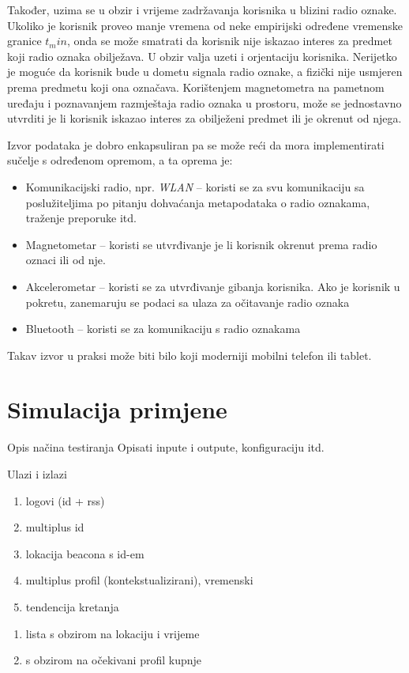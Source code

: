 \documentclass[times, utf8, diplomski, numeric]{fer}
\begin{document}
Također, uzima se u obzir i vrijeme zadržavanja korisnika u blizini radio
oznake. Ukoliko je korisnik proveo manje vremena od neke empirijski određene
vremenske granice $t_min$, onda se može smatrati da korisnik nije iskazao
interes za predmet koji radio oznaka obilježava.
U obzir valja uzeti i orjentaciju korisnika. Nerijetko je moguće da korisnik
bude u dometu signala radio oznake, a fizički nije usmjeren prema predmetu koji
ona označava. Korištenjem magnetometra na pametnom uređaju i poznavanjem
razmještaja radio oznaka u prostoru, može se jednostavno utvrditi je li korisnik
iskazao interes za obilježeni predmet ili je okrenut od njega.

Izvor podataka je dobro enkapsuliran pa se može reći da mora implementirati
sučelje s određenom opremom, a ta oprema je:
\begin{itemize}
  \item Komunikacijski radio, npr. \emph{WLAN}  -- koristi
  se za svu komunikaciju sa poslužiteljima po pitanju dohvaćanja metapodataka o
  radio oznakama, traženje preporuke itd.
  \item Magnetometar -- koristi se utvrđivanje je li korisnik okrenut prema
  radio oznaci ili od nje. %
  \item Akcelerometar -- koristi se za utvrđivanje gibanja korisnika. Ako je
  korisnik u pokretu, zanemaruju se podaci sa ulaza za očitavanje radio oznaka
  \item Bluetooth -- koristi se za komunikaciju s radio oznakama
\end{itemize}

Takav izvor u praksi može biti bilo koji moderniji mobilni telefon ili tablet.

\section{Simulacija primjene}
Opis načina testiranja
Opisati inpute i outpute, konfiguraciju itd.

Ulazi i izlazi
\begin{enumerate}
  \item logovi (id + rss)
  \item multiplus id
  \item lokacija beacona s id-em
  \item multiplus profil (kontekstualizirani), vremenski
  \item tendencija kretanja
\end{enumerate}
\begin{enumerate}
  \item lista s obzirom na lokaciju i vrijeme
  \item s obzirom na očekivani profil kupnje
\end{enumerate}
\end{document}
